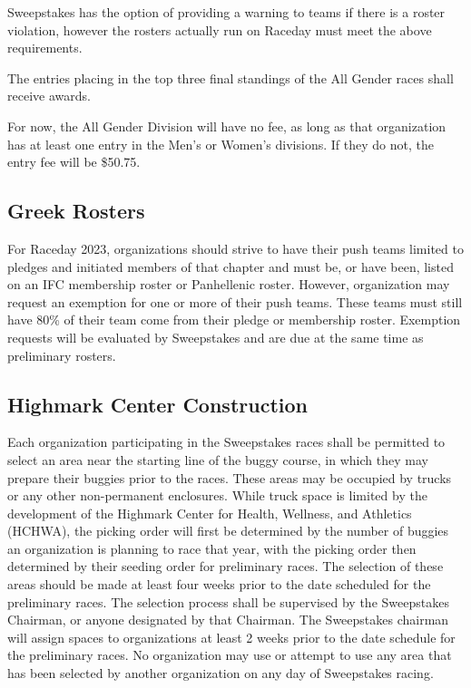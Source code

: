 Sweepstakes has the option of providing a warning to teams if there is a roster violation, however the rosters actually run on Raceday must meet the above requirements. 

The entries placing in the top three final standings of the All Gender races shall receive awards. 

For now, the All Gender Division will have no fee, as long as that organization has at least one entry in the Men's or Women's divisions. If they do not, the entry fee will be \$50.75. 

\subsection*{Greek Rosters} \label{Greek}
For Raceday 2023, organizations should strive to have their push teams limited to pledges and initiated members of that chapter and must be, or have been, listed on an IFC membership roster or Panhellenic roster. However, organization may request an exemption for one or more of their push teams. These teams must still have 80\% of their team come from their pledge or membership roster. Exemption requests will be evaluated by Sweepstakes and are due at the same time as preliminary rosters. 

\subsection*{Highmark Center Construction} \label{Seeding Area}
Each organization participating in the Sweepstakes races shall be permitted to select an area near the starting line of the buggy course, in which they may prepare their buggies prior to the races. These areas may be occupied by trucks or any other non-permanent enclosures. While truck space is limited by the development of the Highmark Center for Health, Wellness, and Athletics (HCHWA), the picking order will first be determined by the number of buggies an organization is planning to race that year, with the picking order then determined by their seeding order for preliminary races. The selection of these areas should be made at least four weeks prior to the date scheduled for the preliminary races. The selection process shall be supervised by the Sweepstakes Chairman, or anyone designated by that Chairman. The Sweepstakes chairman will assign spaces to organizations at least 2 weeks prior to the date schedule for the preliminary races. No organization may use or attempt to use any area that has been selected by another organization on any day of Sweepstakes racing.

